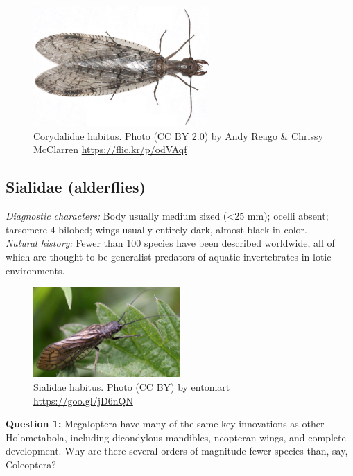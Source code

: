 \documentclass[letterpaper, 11pt]{article}
\begin{document}
\begin{figure}[ht!]
  \centering
    \includegraphics[width=0.6\textwidth]{CorydalidHabitus}
\caption{Corydalidae habitus. Photo (CC BY 2.0) by Andy Reago \& Chrissy McClarren \url{https://flic.kr/p/odVAqf}}
  \label{fig:corydalid}
\end{figure}

\subsection{Sialidae (alderflies)}
\noindent{}\textit{Diagnostic characters:} Body usually medium sized (\textless25 mm); ocelli absent; tarsomere 4 bilobed; wings usually entirely dark, almost black in color.\\

\noindent{}\textit{Natural history:} Fewer than 100 species have been described worldwide, all of which are thought to be generalist predators of aquatic invertebrates in lotic environments.\\

\begin{figure}[ht!]
  \centering
    \includegraphics[width=0.5\textwidth]{SialidHabitus}
  \caption{Sialidae habitus. Photo (CC BY) by \textcopyright{}entomart \url{https://goo.gl/jD6nQN}}
  \label{fig:sialid1}
\end{figure}

\noindent{}\textbf{Question 1:} Megaloptera have many of the same key innovations as other Holometabola, including dicondylous mandibles, neopteran wings, and complete development. Why are there several orders of magnitude fewer species than, say, Coleoptera?
\end{document}
